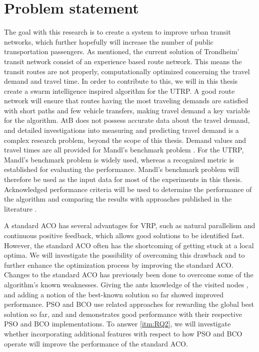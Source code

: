 \section{Problem statement}
\label{subsec:problemStatement}

The goal with this research is to create a system to improve urban transit networks, which further hopefully will increase the number of public transportation passengers. As mentioned, the current solution of Trondheim' transit network consist of an experience based route network. This means the transit routes are not properly, computationally optimized concerning the travel demand and travel time. In order to contribute to this, we will in this thesis create a swarm intelligence inspired algorithm for the UTRP. A good route network will ensure that routes having the most traveling demands are satisfied with short paths and few vehicle transfers, making travel demand a key variable for the algorithm. AtB \citep{website:atb} does not possess accurate data about the travel demand, and detailed investigations into measuring and predicting travel demand is a complex research problem, beyond the scope of this thesis. Demand values and travel times are all provided for Mandl's benchmark problem \citep{mandl79}. For the UTRP, Mandl's benchmark problem is widely used, whereas a recognized metric is established for evaluating the performance. Mandl's benchmark problem will therefore be used as the input data for most of the experiments in this thesis. Acknowledged performance criteria will be used to determine the performance of the algorithm and comparing the results with approaches published in the literature \citep{nikolic14,kechagiopoulos14,mandl79,kidwai98, fan10, chakroborty02, zhang10, chew12}.

A standard ACO has several advantages for VRP, such as natural parallelism and continuous positive feedback, which allows good solutions to be identified fast. However, the standard ACO often has the shortcoming  of getting stuck at a local optima. We will investigate the possibility of overcoming this drawback and to further enhance the optimization process by improving the standard ACO. Changes to the standard ACO has previously been done to overcome some of the algorithm's known weaknesses. Giving the ants knowledge of the visited nodes \citep{sedighpour14,salehinejad10,poorzahedy11}, and adding a notion of the best-known solution so far \citep{tripathi09,sedighpour14} showed improved performance. PSO and BCO use related approaches for rewarding the global best solution so far, and \citet{kechagiopoulos14} and \citet{nikolic14} demonstrates good performance with their respective PSO and BCO implementations. To answer \vref{itm:RQ2}, we will investigate whether incorporating additional features with respect to how PSO and BCO operate will improve the performance of the standard ACO.

